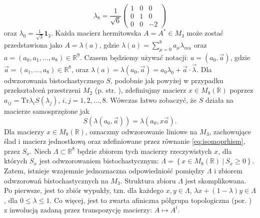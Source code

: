 {\begin{equation}
    \lambda_{8} = \frac{1}{\sqrt{6}} \begin{pmatrix}
            1 & 0 & 0 \\
            0 & 1 & 0 \\
            0 & 0 & -2
        \end{pmatrix}
\end{equation}
oraz $\lambda_{0} = \frac{1}{\sqrt{3}} \mathbf{1}_{3}$.
Każda macierz hermitowska $A = A^{*} \in M_{3}$ może zostać przedstawiona
jako $A = \lambda(a)$, gdzie
$\lambda(a) = \sum_{\mu=0}^{8} a_{\mu} \lambda_{mu}$
oraz
$a = (a_{0}, a_{1}, \ldots, a_{8}) \in \mathbb{R}^{9}$.
Czasem będziemy używać notacji:
$a = (a_{0}, \vec{a})$,
gdzie $\vec{a} = (a_{1},\ldots,a_{8}) \in \mathbb{R}^{8}$,
oraz $\lambda(a) = \lambda(a_{0}, \vec{a}) = a_{0} \lambda_{0} + \vec{a} \cdot \vec{\lambda}$.
Dla odwzorowania bistochastycznego $S$,
podobnie jak powyżej w przypadku przekształceń przestrzeni $M_{2}$
(p. str. \pageref{def:PiofSiso}),
zdefiniujmy macierz $x \in M_{8}(\mathbb{R})$ poprzez
$a_{ij} = \text{Tr} \lambda_{i} S(\lambda_{j})$,
$i,j = 1,2,\ldots,8$.
Wówczas łatwo zobaczyć, że $S$ działa na macierze samosprzężone jak
\begin{equation}
\label{eq:isomoprhism}
S(\lambda(a_{0}, \vec{a})) = \lambda(a_{0}, x \vec{a}).
\end{equation}
Dla macierzy $x \in M_{8}(\mathbb{R})$,
oznaczmy odwzorowanie liniowe na $M_{3}$,
zachowujące ślad i macierz jednostkową
oraz zdefiniowane przez równanie \eqref{eq:isomoprhism},
przez $S_{x}$.
Niech $\Lambda \subset \mathbb{R}^{8}$ będzie zbiorem tych macierzy
rzeczywistych $x$,
dla których $S_{x}$ jest odwzorowaniem bistochastycznym:
$\Lambda = \left \{ x \in M_{8}(\mathbb{R}) \: |  \: S_{x} \geq 0 \right \}$.
Zatem, istnieje wzajemnie jednoznaczna odpowiedniość pomiędzy $\Lambda$
i zbiorem odwzorowań bistochastycznych na $M_{3}$.
Struktura zbioru $\Lambda$ jest skomplikowana.
Po pierwsze, jest to zbiór wypukły,
tzn. dla każdego $x,y \in \Lambda$,
$\lambda x + (1-\lambda)y \in \Lambda$,
dla $0 \leq \lambda \leq 1$.
Co więcej, jest to zwarta afiniczna półgrupa topologiczna
(por. \cite{schwarz1955hausdorff,chow1975compact})
z inwolucją zadaną przez transpozycję macierzy: $A \mapsto A^{t}$.

}
